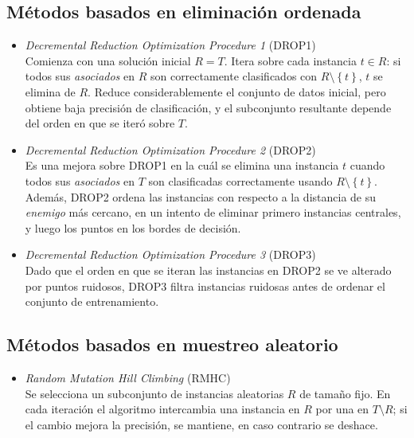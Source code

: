 \subsection{Métodos basados en eliminación ordenada}

\begin{itemize}
\item \emph{Decremental Reduction Optimization Procedure 1} (DROP1) \cite{Wilson:1997:IPT:645526.657143}\\
Comienza con una solución inicial $R = T$. Itera sobre cada instancia $t \in R$: si todos sus \emph{asociados} en $R$ son correctamente clasificados con $R\setminus\left\lbrace t \right\rbrace$, $t$ se elimina de $R$. Reduce considerablemente el conjunto de datos inicial, pero obtiene baja precisión de clasificación, y el subconjunto resultante depende del orden en que se iteró sobre $T$.
\item \emph{Decremental Reduction Optimization Procedure 2} (DROP2) \cite{Wilson:1997:IPT:645526.657143}\\
Es una mejora sobre DROP1 en la cuál se elimina una instancia $t$ cuando todos sus \emph{asociados} en $T$ son clasificadas correctamente usando $R\setminus\left\lbrace t \right\rbrace$. Además, DROP2 ordena las instancias con respecto a la distancia de su \emph{enemigo} más cercano, en un intento de eliminar primero instancias centrales, y luego los puntos en los bordes de decisión.
\item \emph{Decremental Reduction Optimization Procedure 3} (DROP3) \cite{Wilson:1997:IPT:645526.657143}\\
Dado que el orden en que se iteran las instancias en DROP2 se ve alterado por puntos ruidosos, DROP3 filtra instancias ruidosas antes de ordenar el conjunto de entrenamiento.
\end{itemize}

\subsection{Métodos basados en muestreo aleatorio}

\begin{itemize}
\item \emph{Random Mutation Hill Climbing} (RMHC) \cite{DBLP:conf/icml/Skalak94}\\
Se selecciona un subconjunto de instancias aleatorias $R$ de tamaño fijo. En cada iteración el algoritmo intercambia una instancia en $R$ por una en $T \setminus R$; si el cambio mejora la precisión, se mantiene, en caso contrario se deshace.
\end{itemize}

